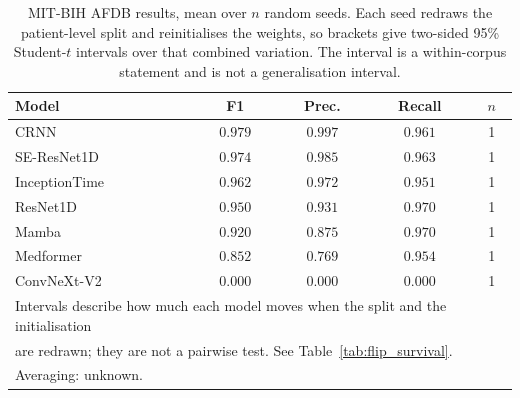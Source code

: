 \begin{table}[ht]
\centering
\caption{MIT-BIH AFDB results, mean over $n$ random seeds. Each seed redraws the patient-level split and reinitialises the weights, so brackets give two-sided 95\% Student-$t$ intervals over that combined variation. The interval is a within-corpus statement and is not a generalisation interval.}
\label{tab:seed_mitbih_afdb}
\small
\begin{tabular}{lcccc}
\toprule
Model & F1 & Prec. & Recall & $n$ \\
\midrule
CRNN & $0.979$ & $0.997$ & $0.961$ & 1 \\
SE-ResNet1D & $0.974$ & $0.985$ & $0.963$ & 1 \\
InceptionTime & $0.962$ & $0.972$ & $0.951$ & 1 \\
ResNet1D & $0.950$ & $0.931$ & $0.970$ & 1 \\
Mamba & $0.920$ & $0.875$ & $0.970$ & 1 \\
Medformer & $0.852$ & $0.769$ & $0.954$ & 1 \\
ConvNeXt-V2 & $0.000$ & $0.000$ & $0.000$ & 1 \\
\midrule
\multicolumn{5}{l}{\footnotesize Intervals describe how much each model moves when the split and the initialisation} \\
\multicolumn{5}{l}{\footnotesize are redrawn; they are not a pairwise test. See Table~\ref{tab:flip_survival}.} \\
\multicolumn{5}{l}{\footnotesize Averaging: unknown.} \\
\bottomrule
\end{tabular}
\end{table}
